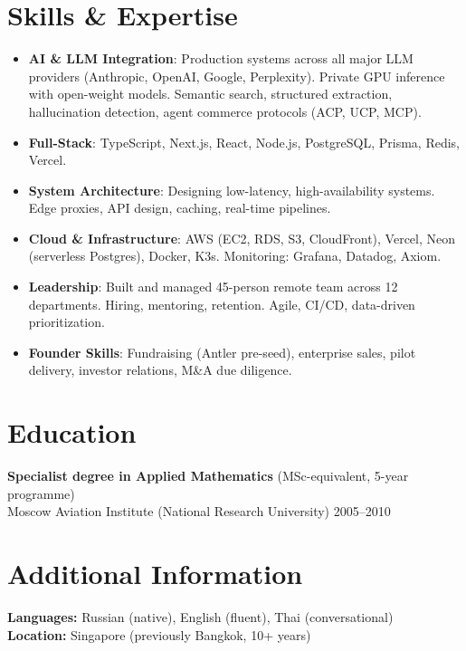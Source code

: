 \documentclass[11pt,a4paper]{article}
\begin{document}
\section*{Skills \& Expertise}
\begin{itemize}
    \item \textbf{AI \& LLM Integration}: Production systems across all major LLM providers (Anthropic, OpenAI, Google, Perplexity). Private GPU inference with open-weight models. Semantic search, structured extraction, hallucination detection, agent commerce protocols (ACP, UCP, MCP).
    \item \textbf{Full-Stack}: TypeScript, Next.js, React, Node.js, PostgreSQL, Prisma, Redis, Vercel.
    \item \textbf{System Architecture}: Designing low-latency, high-availability systems. Edge proxies, API design, caching, real-time pipelines.
    \item \textbf{Cloud \& Infrastructure}: AWS (EC2, RDS, S3, CloudFront), Vercel, Neon (serverless Postgres), Docker, K3s. Monitoring: Grafana, Datadog, Axiom.
    \item \textbf{Leadership}: Built and managed 45-person remote team across 12 departments. Hiring, mentoring, retention. Agile, CI/CD, data-driven prioritization.
    \item \textbf{Founder Skills}: Fundraising (Antler pre-seed), enterprise sales, pilot delivery, investor relations, M\&A due diligence.
\end{itemize}

\section*{Education}
\textbf{Specialist degree in Applied Mathematics} (MSc-equivalent, 5-year programme) \\
Moscow Aviation Institute (National Research University) \hfill 2005--2010

\section*{Additional Information}
\textbf{Languages:} Russian (native), English (fluent), Thai (conversational) \\
\textbf{Location:} Singapore (previously Bangkok, 10+ years)
\end{document}
